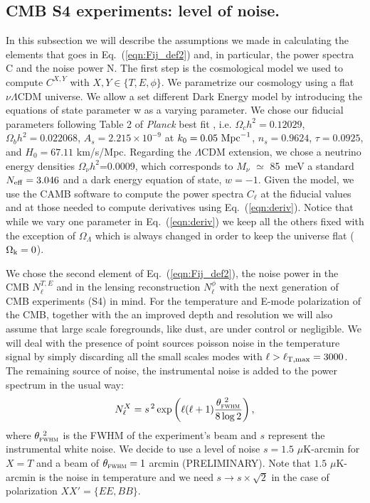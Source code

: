 \documentclass[aps,prd,reprint,superscriptaddress]{revtex4-1}
\newcommand\refeq[1]{Eq.~(\ref{eqn:#1})}
\begin{document}
\subsection{CMB S4 experiments: level of noise.\label{subsec:cosmo-noise}}
In this subsection we will describe the assumptions we made in calculating the elements that goes in \refeq{Fij_def2} and, in particular, the power spectra C and the noise power N.
The first step is the cosmological model we used to compute $C^{X,Y}$ with $X,Y \in \{T,E,\phi\}$.
We parametrize our cosmology using a flat $\nu \Lambda$CDM universe. We allow a set different Dark Energy model by introducing the equations of state parameter w as a varying parameter.
We chose our fiducial parameters following Table 2 of \textit{Planck} best fit \cite{planck-collaboration:2014g}, i.e. $\Omega_c h^2 = 0.12029$, $\Omega_b h^2 = 0.022068$, $A_s = 2.215\times10^{-9}$ at $k_0 = 0.05\ {\rm Mpc}^{-1}$, $n_s = 0.9624$, $\tau = 0.0925$, and $H_0 = 67.11$ km/s/Mpc. Regarding the $\Lambda$CDM extension, we chose a neutrino energy densities $\Omega_{\nu} h^2$=0.0009, which corresponds to $M_{\nu}$ $\simeq$ 85\ meV a standard $N_{\rm eff}=3.046$ and a dark energy equation of state, $w=-1$.
Given the model, we use the CAMB \cite{Lewis:1999bs} software to compute the power spectra $C_{\ell}$ at the fiducial values and at those needed to compute derivatives using \refeq{deriv}. Notice that while we vary one parameter in \refeq{deriv} we keep all the others fixed with the exception of $\Omega_{\Lambda}$ which is always changed in order to keep the universe flat ($\Omega_{\rm k} = 0$).

We chose the second element of \refeq{Fij_def2}, the noise power in the CMB $N_{\ell}^{T,E}$ and in the lensing reconstruction $N_{\ell}^{\phi}$ with the next generation of CMB experiments (S4) in mind.
For the temperature and E-mode polarization of the CMB, together with the an improved depth and resolution we will also assume that large scale foregrounds, like dust, are under control or negligible. We will deal with the presence of point sources poisson noise in the temperature signal by simply discarding all the small scales modes with $\ell>\ell_{\rm T,max}=3000$.
The remaining source of noise, the instrumental noise is added to the power spectrum in the usual way:
 \begin{equation}
 	\centering
		N^{X}_\ell = s^{\, 2} \exp \left(\ell(\ell+1) \frac{\theta^{\ 2}_{\textsc{fwhm}}}{8\log2}\right),
	\label{eq:beamnoise}
\end{equation}
where $\theta^{\ 2}_{\textsc{fwhm}}$ is the FWHM of the experiment's beam and $s$ represent the instrumental white noise.
We decide to use a level of noise $s = 1.5$ $\mu$K-arcmin for $X=T$ and a beam of $\theta_{\textsc{fwhm}}=1$ arcmin (PRELIMINARY).
Note that $1.5$ $\mu$K-arcmin is the noise in temperature and we need $s \rightarrow s\times \sqrt{2}$ in the case of polarization $ XX' = \{ EE, BB \}$.
\end{document}
